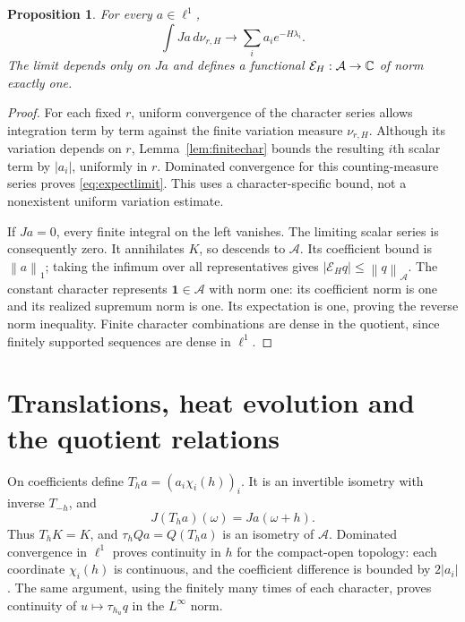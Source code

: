 \documentclass[11pt]{article}
\newtheorem{proposition}[theorem]{Proposition}
\theoremstyle{remark}\newtheorem{remark}[theorem]{Remark}
\newcommand{\A}{\mathcal A}\newcommand{\X}{\mathcal X}
\newcommand{\E}{\mathcal E}\newcommand{\norm}[1]{\left\lVert#1\right\rVert}
\begin{document}
\begin{proposition}\label{prop:expect}
For every $a\in\ell^1$,
\begin{equation}\label{eq:expectlimit}
 \int Ja\,d\nu_{r,H}\longrightarrow\sum_i a_i e^{-H\lambda_i}.
\end{equation}
The limit depends only on $Ja$ and defines a functional $\E_H:\A\to\C$ of norm exactly one.
\end{proposition}
\begin{proof}
For each fixed $r$, uniform convergence of the character series allows integration term by term against the finite variation measure $\nu_{r,H}$. Although its variation depends on $r$, Lemma~\ref{lem:finitechar} bounds the resulting $i$th scalar term by $|a_i|$, uniformly in $r$. Dominated convergence for this counting-measure series proves \eqref{eq:expectlimit}. This uses a character-specific bound, not a nonexistent uniform variation estimate.

If $Ja=0$, every finite integral on the left vanishes. The limiting scalar series is consequently zero. It annihilates $K$, so descends to $\A$. Its coefficient bound is $\norm a_1$; taking the infimum over all representatives gives $|\E_H q|\le\norm q_{\A}$. The constant character represents $\mathbf1\in\A$ with norm one: its coefficient norm is one and its realized supremum norm is one. Its expectation is one, proving the reverse norm inequality. Finite character combinations are dense in the quotient, since finitely supported sequences are dense in $\ell^1$.
\end{proof}

\section{Translations, heat evolution and the quotient relations}\label{sec:semigroup}
On coefficients define $T_h a=(a_i\chi_i(h))_i$. It is an invertible isometry with inverse $T_{-h}$, and
\[
 J(T_h a)(\omega)=Ja(\omega+h).
\]
Thus $T_hK=K$, and $\tau_h Qa=Q(T_h a)$ is an isometry of $\A$. Dominated convergence in $\ell^1$ proves continuity in $h$ for the compact-open topology: each coordinate $\chi_i(h)$ is continuous, and the coefficient difference is bounded by $2|a_i|$. The same argument, using the finitely many times of each character, proves continuity of $u\mapsto\tau_{h_u}q$ in the $L^\infty$ norm.
\end{document}
